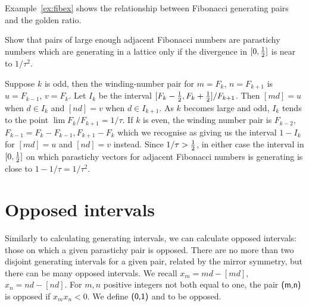 Example~\ref{ex:fibex} shows the relationship between Fibonacci generating pairs and the golden ratio. 



\begin{jExercise}
	Show that  pairs of large enough adjacent Fibonacci numbers are parastichy numbers which are generating in a lattice only if the divergence in $[0,\textstyle{\frac{1}{2}}]$ is near to $1/\tau^2$.
	\label{ex:fibex}
\end{jExercise}
\begin{jAnswer}
	Suppose $k$ is odd, then the winding-number pair for 
	$m=F_k$, $n=F_{k+1}$ is $u=F_{k-1}$, $v=F_{k}$. 
	Let $I_k$ be the interval $[F_k-\textstyle{\frac{1}{2}},F_k+\textstyle{\frac{1}{2}}]/F_{k+1}$. 
	Then $[md]=u$ when $d\in I_k$ and $[nd]=v$ when $d\in I_{k+1}$.
	As $k$ becomes large and odd, $I_k$ tends to the point $\lim F_k/F_{k+1}=1/\tau$.
	If $k$ is even, the winding number pair is $F_{k-2}$,$F_{k-1} = F_{k}-F_{k-1},F_{k+1}-F_k$ which we recognise as giving us the interval $1-I_k$ for $[md]=u$ and $[nd]=v$ instead.  
Since $1/\tau>\textstyle{\frac{1}{2}}$, in either case the interval in $[0,\textstyle{\frac{1}{2}}]$ on which
parastichy vectors for adjacent Fibonacci numbers
 is generating is close to $1-1/\tau=1/\tau^2$. 	
\end{jAnswer}



\section{Opposed intervals}
Similarly to calculating generating intervals, we can calculate opposed intervals: those on which a given parastichy pair is opposed. There are no more than two disjoint generating intervals for a given pair, related by the mirror symmetry, but there can be many opposed intervals. 
We recall 
$
x_m = m d - [ m d]$,
$
x_n = n d - [ n d ].
$
For $m,n$ positive integers not both equal to one, the pair $\textsf{(m,n)}$ is {opposed} if $x_m x_n <0$.
We define $\textsf{(0,1)}$  and   to be opposed.
\clearpage
